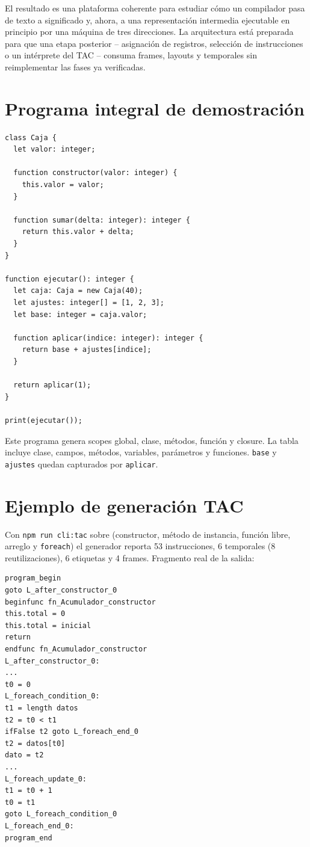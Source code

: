 \documentclass[11pt,letterpaper,oneside]{report}
\newcommand{\archivo}[1]{\path{#1}}
\newcommand{\codigo}[1]{\texttt{#1}}
\begin{document}
El resultado es una plataforma coherente para estudiar cómo un compilador pasa de
texto a significado y, ahora, a una representación intermedia ejecutable en
principio por una máquina de tres direcciones. La arquitectura está preparada para
que una etapa posterior -- asignación de registros, selección de instrucciones o un
intérprete del TAC -- consuma frames, layouts y temporales sin reimplementar las
fases ya verificadas.

\appendix

\chapter{Programa integral de demostración}

\begin{verbatim}
class Caja {
  let valor: integer;

  function constructor(valor: integer) {
    this.valor = valor;
  }

  function sumar(delta: integer): integer {
    return this.valor + delta;
  }
}

function ejecutar(): integer {
  let caja: Caja = new Caja(40);
  let ajustes: integer[] = [1, 2, 3];
  let base: integer = caja.valor;

  function aplicar(indice: integer): integer {
    return base + ajustes[indice];
  }

  return aplicar(1);
}

print(ejecutar());
\end{verbatim}

Este programa genera scopes global, clase, métodos, función y closure. La tabla
incluye clase, campos, métodos, variables, parámetros y funciones. \codigo{base} y
\codigo{ajustes} quedan capturados por \codigo{aplicar}.

\chapter{Ejemplo de generación TAC}

Con \codigo{npm run cli:tac} sobre
\archivo{examples/tac/13\_programa\_integral.cps} (constructor, método de
instancia, función libre, arreglo y \codigo{foreach}) el generador reporta 53
instrucciones, 6 temporales (8 reutilizaciones), 6 etiquetas y 4 frames. Fragmento
real de la salida:

\begin{verbatim}
program_begin
goto L_after_constructor_0
beginfunc fn_Acumulador_constructor
this.total = 0
this.total = inicial
return
endfunc fn_Acumulador_constructor
L_after_constructor_0:
...
t0 = 0
L_foreach_condition_0:
t1 = length datos
t2 = t0 < t1
ifFalse t2 goto L_foreach_end_0
t2 = datos[t0]
dato = t2
...
L_foreach_update_0:
t1 = t0 + 1
t0 = t1
goto L_foreach_condition_0
L_foreach_end_0:
program_end
\end{verbatim}
\end{document}

